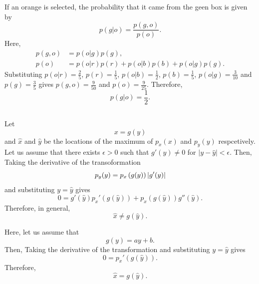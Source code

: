 If an orange is selected, the probability that it came from the geen box is given by
%
\begin{equation}
p(g | o) = \frac{p(g, o)}{p(o)}.
\end{equation}
%
Here,
%
\begin{equation}
\begin{aligned}
p(g, o) &= p(o | g) p(g), \\
p(o) & = p(o | r) p(r) + p(o | b) p(b) + p(o | g) p(g).
\end{aligned}
\end{equation}
%
Substituting 
$p(o | r) = \frac{2}{5}$, 
$p(r) = \frac{1}{5}$, 
$p(o | b) = \frac{1}{2}$, 
$p(b) = \frac{1}{5}$, 
$p(o | g) = \frac{3}{10}$ 
and 
$p(g) = \frac{3}{5}$ 
gives 
$p(g, o) = \frac{9}{50}$ 
and 
$p(o) = \frac{9}{25}$.
%
Therefore,
\begin{equation}
p(g | o) = \frac{1}{2}.
\end{equation}


\subsection{}
\label{1.4}
Let 
%
\begin{equation}
x 
= 
g(y)
\end{equation}
%
and $\hat{x}$ and $\hat{y}$ be the locations of the maximum of $p_x(x)$ and $p_y(y)$ respcetively.
Let us assume that there exists $\epsilon > 0$ such that $g'(y) \neq 0$ for $\left| y - \hat{y} \right| < \epsilon$.
Then, Taking the derivative of the transoformation
%
\begin{equation}
p_y(y) 
= 
p_x 
\left( 
	g(y) 
\right) 
\abs{g'(y)}
\end{equation}
%
and substituting $y = \hat{y}$ gives
%
\begin{equation}
0 
= 
g'(\hat{y}) 
p_x' 
\left( 
	g 
	\left( 
		\hat{y} 
	\right) 
\right) 
+ 
p_x 
\left( 
	g 
	\left( 
		\hat{y} 
	\right) 
\right) 
g'' 
\left( 
	\hat{y} 
\right).
\end{equation}
%
Therefore, in general,
%
\begin{equation}
\hat{x} 
\neq 
g 
\left( 
	\hat{y} 
\right).
\end{equation}
%

Here, let us assume that 
%
\begin{equation}
g(y) 
= 
a y 
+ 
b.
\end{equation}
%
Then, Taking the derivative of the transformation and substituting $y = \hat{y}$ gives
%
\begin{equation}
0 
= 
p_x' 
\left( 
	g 
	\left( 
		\hat{y} 
	\right) 
\right).
\end{equation}
%
Therefore, 
%
\begin{equation}
\hat{x} 
= 
g 
\left( 
	\hat{y} 
\right).
\end{equation}
%


